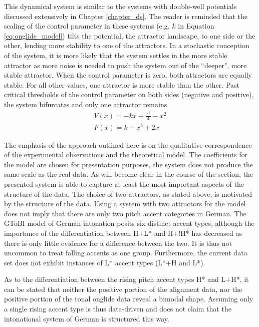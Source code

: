 This dynamical system is similar to the systems with double-well potentials discussed extensively in Chapter \ref{chapter_ds}. The reader is reminded that the scaling of the control parameter in these systems (e.g. $k$ in Equation \ref{eq:onglide_model}) tilts the potential, the attractor landscape, to one side or the other, lending more stability to one of the attractors. In a stochastic conception of the system, it is more likely that the system settles in the more stable attractor as more noise is needed to push the system out of the ``deeper", more stable attractor. When the control parameter is zero, both attractors are equally stable. For all other values, one attractor is more stable than the other. Past critical thresholds of the control parameter on both sides (negative and positive), the system bifurcates and only one attractor remains. 
\begin{equation}
\begin{split}
V(x) = -kx + \frac{x^4}{4} - x^2 \\
F(x) = k - x^3 + 2x
\label{eq:onglide_model}
\end{split}
\end{equation}

The emphasis of the approach outlined here is on the qualitative correspondence of the experimental observations and the theoretical model. The coefficients for the model are chosen for presentation purposes, the system does not produce the same scale as the real data. As will become clear in the course of the section, the presented system is able to capture at least the most important aspects of the structure of the data. The choice of two attractors, as stated above, is motivated by the structure of the data. Using a system with two attractors for the model does not imply that there are only two pitch accent categories in German. The GToBI model of German intonation \citep{GriceBaumann2002} posits six distinct accent types, although the importance of the differentiation between H+L* and H+!H* has decreased as there is only little evidence for a difference between the two. It is thus not uncommon to treat falling accents as one group. Furthermore, the current data set does not exhibit instances of L* accent types (L*+H and L*). 

As to the differentiation between the rising pitch accent types H* and L+H*, it can be stated that neither the positive portion of the alignment data, nor the positive portion of the tonal onglide data reveal a bimodal shape. Assuming only a single rising accent type is thus data-driven and does not claim that the intonational system of German is structured this way.

